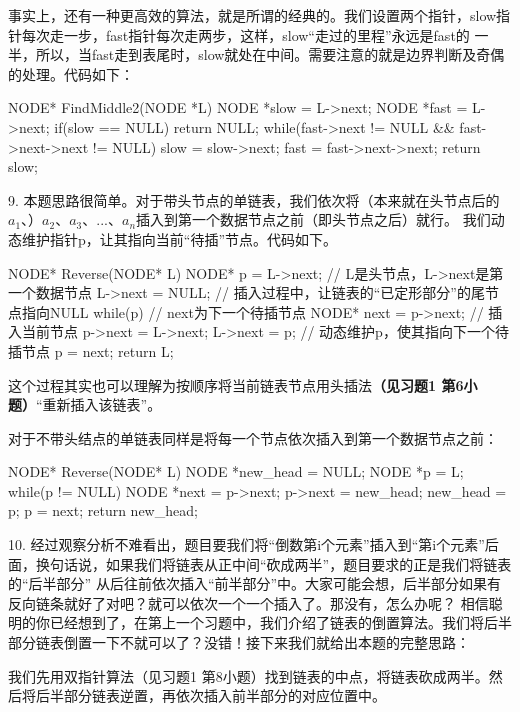 \begin{exerciseanswer}
事实上，还有一种更高效的算法，就是所谓的经典的。我们设置两个指针，slow指针每次走一步，fast指针每次走两步，这样，slow“走过的里程”永远是fast的
一半，所以，当fast走到表尾时，slow就处在中间。需要注意的就是边界判断及奇偶的处理。代码如下：
\begin{cppcode}
    NODE* FindMiddle2(NODE *L) {
        NODE *slow = L->next;
        NODE *fast = L->next;
        if(slow == NULL)
            return NULL;
        while(fast->next != NULL && fast->next->next != NULL) {
            slow = slow->next;
            fast = fast->next->next;
        }
        return slow;  
    }
\end{cppcode}

9. 本题思路很简单。对于带头节点的单链表，我们依次将（本来就在头节点后的\(a_1\)、）\(a_2\)、\(a_3\)、...、\(a_n\)插入到第一个数据节点之前（即头节点之后）就行。
我们动态维护指针p，让其指向当前“待插”节点。代码如下。
\begin{cppcode}
    NODE* Reverse(NODE* L) {
        NODE* p = L->next;  // L是头节点，L->next是第一个数据节点
        L->next = NULL;     // 插入过程中，让链表的“已定形部分”的尾节点指向NULL
        while(p) {
            // next为下一个待插节点
            NODE* next = p->next;
            // 插入当前节点
            p->next = L->next;
            L->next = p;
            // 动态维护p，使其指向下一个待插节点
            p = next;
        }
        return L;
    }
\end{cppcode}
这个过程其实也可以理解为按顺序将当前链表节点用头插法{\color{red}\textbf{（见习题1 第6小题）}}“重新插入该链表”。

对于不带头结点的单链表同样是将每一个节点依次插入到第一个数据节点之前：
\begin{cppcode}
    NODE* Reverse(NODE* L) {
        NODE *new_head = NULL;
        NODE *p = L;
        while(p != NULL) {
            NODE *next = p->next;
            p->next = new_head;
            new_head = p;
            p = next;
        }
        return new_head;
    }
\end{cppcode}

10. 经过观察分析不难看出，题目要我们将“倒数第i个元素”插入到“第i个元素”后面，换句话说，如果我们将链表从正中间“砍成两半”，题目要求的正是我们将链表的“后半部分”
从后往前依次插入“前半部分”中。大家可能会想，后半部分如果有反向链条就好了对吧？就可以依次一个一个插入了。那没有，怎么办呢？
相信聪明的你已经想到了，在第上一个习题中，我们介绍了链表的倒置算法。我们将后半部分链表倒置一下不就可以了？没错！接下来我们就给出本题的完整思路：

我们先用双指针算法（见习题1 第8小题）找到链表的中点，将链表砍成两半。然后将后半部分链表逆置，再依次插入前半部分的对应位置中。


\end{exerciseanswer}
